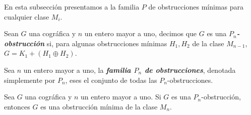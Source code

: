 En esta subsección presentamos a la familia $P$ de obstrucciones mínimas para cualquier clase $M_i$.

Sean $G$ una cográfica y $n$ un entero mayor a uno, decimos que $G$ es una \emph{\textbf{$P_n$-obstrucción}} si, para algunas obstrucciones mínimas $H_1, H_2$ de la clase $M_{n-1}$, $G=K_1+(H_1\oplus H_2)$.

Sea $n$ un entero mayor a uno, la \emph{\textbf{familia $P_n$ de obstrucciones}}, denotada simplemente por $P_n$, eses el conjunto de todas las $P_n$-obstrucciones.

\begin{theorem}
\label{teo_familiaP}
Sea $G$ una cográfica y $n$ un entero mayor a uno. Si $G$ es una $P_n$-obstrucción, entonces $G$ es una obstrucción mínima de la clase $M_n$.
\end{theorem}



